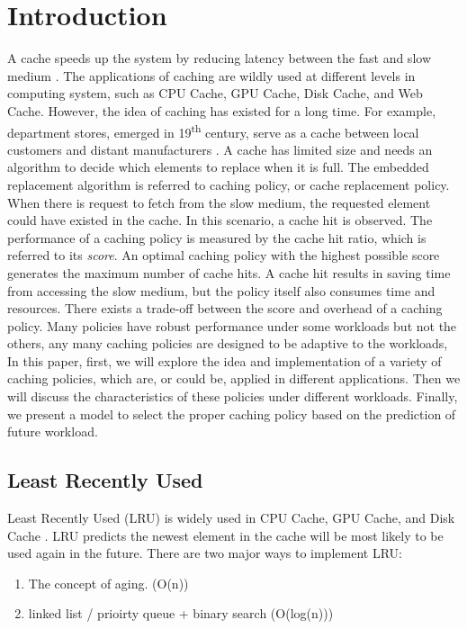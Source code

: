 \section{Introduction}
A cache speeds up the system by reducing latency between the fast and slow medium \cite{cache}.
The applications of caching are wildly used at different levels in computing system, such as
  CPU Cache, GPU Cache, Disk Cache, and Web Cache.
However, the idea of caching has existed for a long time.
For example, department stores, emerged in 19\textsuperscript{th} century,  
  serve as a cache between local customers and distant manufacturers \cite{departmentstores}.
A cache has limited size and needs an algorithm to decide which elements to replace when it is full.
The embedded replacement algorithm is referred to caching policy, or cache replacement policy.
When there is request to fetch from the slow medium, 
  the requested element could have existed in the cache.
In this scenario, a cache hit is observed.
The performance of a caching policy is measured by the cache hit ratio, 
  which is referred to its \textit{score}.
An optimal caching policy with the highest possible score generates the maximum number of cache hits.
A cache hit results in saving time from accessing the slow medium, 
  but the policy itself also consumes time and resources. 
There exists a trade-off between the score and overhead of a caching policy.
Many policies have robust performance under some workloads but not the others,
  any many caching policies are designed to be adaptive to the workloads,
In this paper, first, we will explore the idea and implementation of a variety of caching policies,
  which are, or could be, applied in different applications.
Then we will discuss the characteristics of these policies under different workloads.
Finally, we present a model to select the proper caching policy based on the prediction of future workload.

\subsection{Least Recently Used}
Least Recently Used (LRU) is widely used in CPU Cache, GPU Cache, and Disk Cache \cite{itanium}.
LRU predicts the newest element in the cache will be most likely to be used again in the future.
There are two major ways to implement LRU:
\begin{enumerate}
  \item The concept of aging. (O(n))
  \item linked list / prioirty queue + binary search (O(log(n)))
\end{enumerate}

